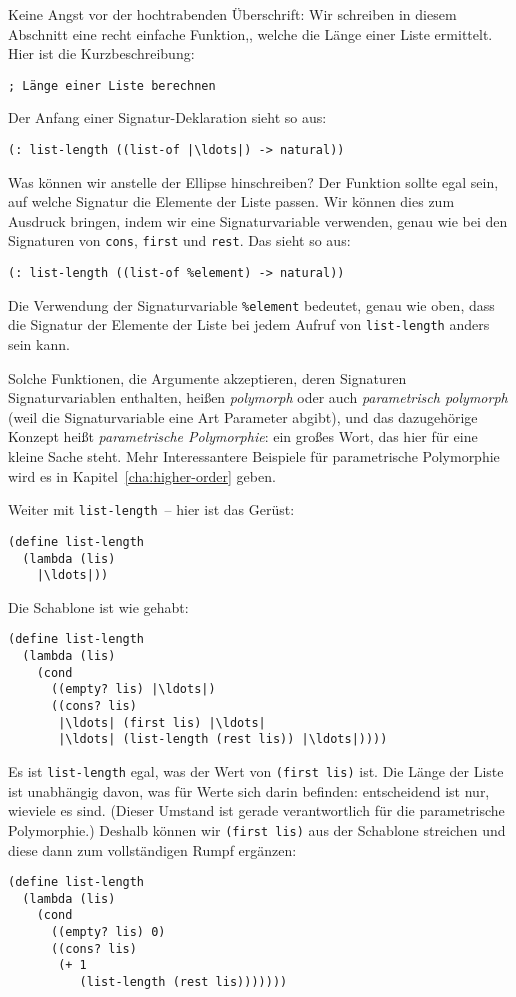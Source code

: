 Keine Angst vor der hochtrabenden Überschrift: Wir schreiben in diesem
Abschnitt eine recht einfache Funktion,, welche die Länge einer Liste
ermittelt. Hier ist die
Kurzbeschreibung:
%
\begin{lstlisting}
; Länge einer Liste berechnen
\end{lstlisting}
%
Der Anfang einer Signatur-Deklaration sieht so aus:
%
\begin{lstlisting}
(: list-length ((list-of |\ldots|) -> natural))
\end{lstlisting}
%
Was können wir anstelle der Ellipse hinschreiben?  Der Funktion sollte
egal sein, auf welche Signatur die Elemente der Liste passen. Wir
können dies zum Ausdruck bringen, indem wir eine Signaturvariable
verwenden, genau wie bei den Signaturen von \lstinline{cons},
\lstinline{first} und \lstinline{rest}.  Das sieht so aus:\label{page:list-length}
%
\begin{lstlisting}
(: list-length ((list-of %element) -> natural))
\end{lstlisting}
%
Die Verwendung der Signaturvariable \lstinline{%element} bedeutet,
genau wie oben, dass die Signatur der Elemente der Liste bei jedem
Aufruf von \lstinline{list-length} anders sein kann.

Solche Funktionen, die Argumente akzeptieren, deren Signaturen
Signaturvariablen enthalten, heißen \textit{polymorph} oder auch
\textit{parametrisch polymorph} (weil die Signaturvariable eine Art
Parameter abgibt), und das dazugehörige Konzept heißt
\textit{parametrische
  Polymorphie}:
ein großes Wort, das hier für eine kleine Sache steht.  Mehr Interessantere
Beispiele für parametrische Polymorphie wird es in
Kapitel~\ref{cha:higher-order} geben.

Weiter mit \texttt{list-length}~-- hier ist das Gerüst:
%
\begin{lstlisting}
(define list-length
  (lambda (lis)
    |\ldots|))
\end{lstlisting}
%
Die Schablone ist wie gehabt:
%
\begin{lstlisting}
(define list-length
  (lambda (lis)
    (cond
      ((empty? lis) |\ldots|)
      ((cons? lis) 
       |\ldots| (first lis) |\ldots|
       |\ldots| (list-length (rest lis)) |\ldots|))))
\end{lstlisting}
%
Es ist \texttt{list-length} egal, was der Wert von \texttt{(first
  lis)} ist.  Die Länge der Liste ist unabhängig davon, was für Werte
sich darin befinden: entscheidend ist nur, wieviele es sind.  (Dieser
Umstand ist gerade verantwortlich für die parametrische Polymorphie.)
Deshalb können wir \texttt{(first lis)} aus der Schablone streichen und
diese dann zum vollständigen Rumpf ergänzen:
%
\begin{lstlisting}
(define list-length
  (lambda (lis)
    (cond
      ((empty? lis) 0)
      ((cons? lis) 
       (+ 1 
          (list-length (rest lis)))))))
\end{lstlisting}
%

